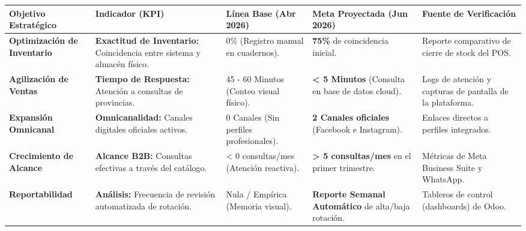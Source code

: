 \begin{table}[H]
\centering
\renewcommand{\arraystretch}{1.3}
\setlength{\tabcolsep}{4pt}
\scriptsize
\begin{tabular}{|p{2.5cm}|p{2.8cm}|p{2.8cm}|p{3.2cm}|p{3.2cm}|}
\hline
\rowcolor{gray!20}
\textbf{Objetivo Estratégico} & \textbf{Indicador (KPI)} & \textbf{Línea Base (Abr 2026)} & \textbf{Meta Proyectada (Jun 2026)} & \textbf{Fuente de Verificación} \\ \hline
\textbf{Optimización de Inventario} & \textbf{Exactitud de Inventario:} Coincidencia entre sistema y almacén físico. & 0\% (Registro manual en cuadernos). & \textbf{75\%} de coincidencia inicial. & Reporte comparativo de cierre de stock del POS. \\ \hline
\textbf{Agilización de Ventas} & \textbf{Tiempo de Respuesta:} Atención a consultas de provincias. & 45 - 60 Minutos (Conteo visual físico). & \textbf{< 5 Minutos} (Consulta en base de datos cloud). & Logs de atención y capturas de pantalla de la plataforma. \\ \hline
\textbf{Expansión Omnicanal} & \textbf{Omnicanalidad:} Canales digitales oficiales activos. & 0 Canales (Sin perfiles profesionales). & \textbf{2 Canales oficiales} (Facebook e Instagram). & Enlaces directos a perfiles integrados. \\ \hline
\textbf{Crecimiento de Alcance} & \textbf{Alcance B2B:} Consultas efectivas a través del catálogo. & < 0 consultas/mes (Atención reactiva). & \textbf{> 5 consultas/mes} en el primer trimestre. & Métricas de Meta Business Suite y WhatsApp. \\ \hline
\textbf{Reportabilidad} & \textbf{Análisis:} Frecuencia de revisión automatizada de rotación. & Nula / Empírica (Memoria visual). & \textbf{Reporte Semanal Automático} de alta/baja rotación. & Tableros de control (dashboards) de Odoo. \\ \hline
\end{tabular}
\end{table}
